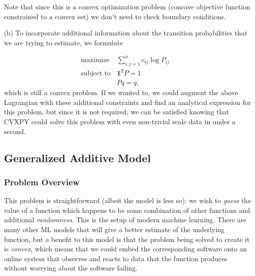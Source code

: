 \documentclass[12pt,reqno]{article}
\theoremstyle{definition}
\numberwithin{equation}{section}
\begin{document}
\noindent Note that since this is a convex optimization problem (concave objective function constrained to a convex set)
we don't need to check boundary conditions.

\vspace{0.1cm}
\noindent (b) To incorporate additional information about the transition probabilities that we are trying to estimate,
we formulate

\[\begin{array}{lll}
    \text{maximize} \; & \sum_{i, j=1}^{n} c_{ij}\log P_{ij} & \\
    \text{subject to} & \bm{1}^T P = 1 & \\
    & Pq = q,
    \end{array}\]
which is still a convex problem. If we wanted to, we could augment the above Lagrangian with
these additional constraints and find an analytical expression for this problem, but since it is not
required, we can be satisfied knowing that CVXPY could solve this problem with even non-trivial scale data
in under a second.

\newpage
\subsection{Generalized Additive Model}

\subsubsection*{Problem Overview}
This problem is straightforward (albeit the model is less so): we wish to \textit{guess} the value
of a function which happens to be some combination of other functions and additional \textit{randomness}.
This is the setup of modern machine learning. There are many other ML models that will
give a better estimate of the underlying function, but a benefit to this model is that
the problem being solved to create it is \textit{convex}, which means that we could embed the corresponding software
onto an online system that observes and reacts to data that the function produces without worrying about
the software failing. 
\end{document}
